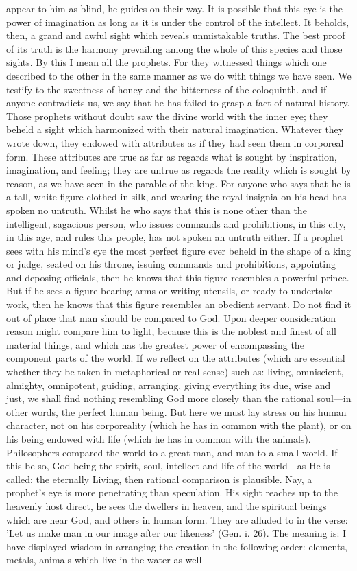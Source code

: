 \documentclass[12pt]{article}
\begin{document}
appear to him as blind, he guides on their way. It is possible that this eye is the power of imagination as long as it is under the control of the intellect. It beholds, then, a grand and awful sight which reveals unmistakable truths. The best proof of its truth is the harmony prevailing among the whole of this species and those sights. By this I mean all the prophets. For they witnessed things which one described to the other in the same manner as we do with things we have seen. We testify to the sweetness of honey and the bitterness of the coloquinth. and if anyone contradicts us, we say that he has failed to grasp a fact of natural history. Those prophets without doubt saw the divine world with the inner eye; they beheld a sight which harmonized with their natural imagination. Whatever they wrote down, they endowed with attributes as if they had seen them in corporeal form. These attributes are true as far as regards what is sought by inspiration, imagination, and feeling; they are untrue as regards the reality which is sought by reason, as we have seen in the parable of the king. For anyone who says that he is a tall, white figure clothed in silk, and wearing the royal insignia on his head has spoken no untruth. Whilst he who says that this is none other than the intelligent, sagacious person, who issues commands and prohibitions, in this city, in this age, and rules this people, has not spoken an untruth either. If a prophet sees with his mind's eye the most perfect figure ever beheld in the shape of a king or judge, seated on his throne, issuing commands and prohibitions, appointing and deposing officials, then he knows that this figure resembles a powerful prince. But if he sees a figure bearing arms or writing utensils, or ready to undertake work, then he knows that this figure resembles an obedient servant. Do not find it out of place that man should be compared to God. Upon deeper consideration reason might compare him to light, because this is the noblest and finest of all material things, and which has the greatest power of encompassing the component parts of the world. If we reflect on the attributes (which are essential whether they be taken in metaphorical or real sense) such as: living, omniscient, almighty, omnipotent, guiding, arranging, giving everything its due, wise and just, we shall find nothing resembling God more closely than the rational soul---in other words, the perfect human being. But here we must lay stress on his human character, not on his corporeality (which he has in common with the plant), or on his being endowed with life (which he has in common with the animals). Philosophers compared the world to a great man, and man to a small world. If this be so, God being the spirit, soul, intellect and life of the world---as He is called: the eternally Living, then rational comparison is plausible. Nay, a prophet's eye is more penetrating than speculation. His sight reaches up to the heavenly host direct, he sees the dwellers in heaven, and the spiritual beings which are near God, and others in human form. They are alluded to in the verse: 'Let us make man in our image after our likeness' (Gen. i. 26). The meaning is: I have displayed wisdom in arranging the creation in the following order: elements, metals, animals which live in the water as well 
\end{document}
